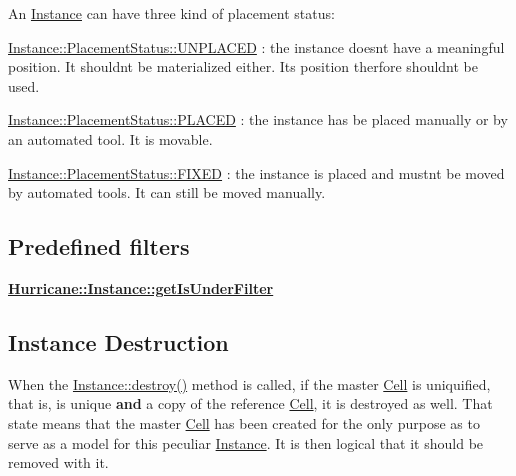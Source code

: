 An \hyperlink{classHurricane_1_1Instance}{Instance} can have three kind of placement status\+:
\begin{DoxyItemize}
\item \hyperlink{classHurricane_1_1Instance_1_1PlacementStatus_af76cc0838783b3eb3a515eb3c3e0f7bfa3e19a0a1b3e8c8fd860164df7f935216}{Instance\+::\+Placement\+Status\+::\+U\+N\+P\+L\+A\+C\+ED} \+: the instance doesn\textquotesingle{}t have a meaningful position. It shouldn\textquotesingle{}t be materialized either. It\textquotesingle{}s position therfore shouldn\textquotesingle{}t be used.
\item \hyperlink{classHurricane_1_1Instance_1_1PlacementStatus_af76cc0838783b3eb3a515eb3c3e0f7bfaf3589c11ecd7d5de63db24826b74d457}{Instance\+::\+Placement\+Status\+::\+P\+L\+A\+C\+ED} \+: the instance has be placed manually or by an automated tool. It is movable.
\item \hyperlink{classHurricane_1_1Instance_1_1PlacementStatus_af76cc0838783b3eb3a515eb3c3e0f7bfa47be8a40f04081635fe24485ae7c6bd7}{Instance\+::\+Placement\+Status\+::\+F\+I\+X\+ED} \+: the instance is placed and mustn\textquotesingle{}t be moved by automated tools. It can still be moved manually.
\end{DoxyItemize}\hypertarget{classHurricane_1_1Instance_secInstancePredefinedFilters}{}\subsection{Predefined filters}\label{classHurricane_1_1Instance_secInstancePredefinedFilters}
{\bfseries \hyperlink{classHurricane_1_1Instance_ae2bc936dfecfaf70a0052959b4b2861e}{Hurricane\+::\+Instance\+::get\+Is\+Under\+Filter}}\hypertarget{classHurricane_1_1Instance_secInstanceDestroy}{}\subsection{Instance Destruction}\label{classHurricane_1_1Instance_secInstanceDestroy}
When the \hyperlink{classHurricane_1_1DBo_a67febf5bf9c8b322674648688639728b}{Instance\+::destroy()} method is called, if the master \hyperlink{classHurricane_1_1Cell}{Cell} is uniquified, that is, is unique {\bfseries and} a copy of the reference \hyperlink{classHurricane_1_1Cell}{Cell}, it is destroyed as well. That state means that the master \hyperlink{classHurricane_1_1Cell}{Cell} has been created for the only purpose as to serve as a model for this peculiar \hyperlink{classHurricane_1_1Instance}{Instance}. It is then logical that it should be removed with it. 

